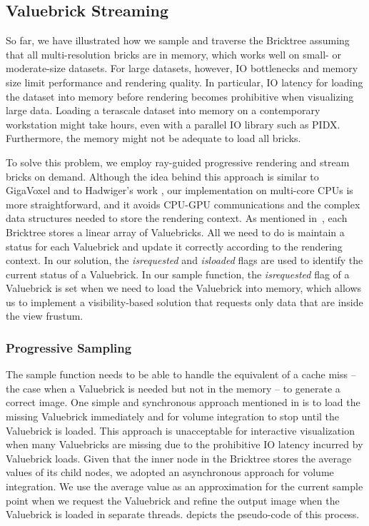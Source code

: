 \subsection{Valuebrick Streaming}
So far, we have illustrated how we sample and traverse the Bricktree assuming that all
multi-resolution bricks are in memory, which works well on small- or moderate-size datasets. 
For large datasets, however, IO bottlenecks and memory size limit performance and rendering
quality. In particular, IO latency for loading the dataset into memory before
rendering becomes prohibitive when visualizing large data. Loading a
terascale dataset into memory on a contemporary workstation might take hours, even with a parallel IO
library such as PIDX. Furthermore, the memory might not be adequate to load all bricks. 


To solve this problem, we employ ray-guided progressive rendering and stream bricks
on demand. Although the idea behind this approach is similar to GigaVoxel\cite{crassin2009gigavoxels}
and to Hadwiger's work \cite{hadwiger2012interactive}, our implementation on multi-core CPUs
is more straightforward, and it avoids CPU-GPU communications and the complex data structures
needed to store the rendering context. As mentioned in~,
each Bricktree stores a linear array of Valuebricks. All we need to do is maintain a
status for each Valuebrick and update it correctly according to the rendering context.
In our solution, the \textit{isrequested} and \textit{isloaded} flags are
used to identify the current status of a Valuebrick. In our sample function, 
the \textit{isrequested} flag of a Valuebrick is set when we need to load the Valuebrick
into memory, which allows us to implement a visibility-based solution that requests only
data that are inside the view frustum. 


\subsubsection{Progressive Sampling}
The sample function needs to be able to handle the equivalent of a cache miss -- the case
when a Valuebrick is needed but not in the memory -- to generate a correct image.
One simple and synchronous approach mentioned in \cite{crassin2009gigavoxels} is to
load the missing Valuebrick immediately and for volume integration to stop until 
the Valuebrick is loaded. 
This approach is unacceptable for interactive visualization when many Valuebricks are missing 
due to the prohibitive IO latency incurred by Valuebrick loads. Given that the inner node
in the Bricktree stores the average values of its child nodes, we adopted an
asynchronous approach for volume integration. We use the average value as an
approximation for the current sample point when we request the Valuebrick and
refine the output image when the Valuebrick is loaded in separate threads. 
 depicts the pseudo-code of this process. 


